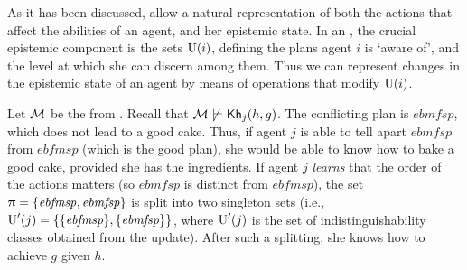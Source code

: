 As it has been discussed,  allow a natural representation of both the actions that affect the abilities of an agent, and her epistemic state. In an \ults, the crucial epistemic component is the sets $\operatorname{U}(i)$, defining the plans agent $i$ is `aware of', and the level at which she can discern among them. Thus we can represent changes in the epistemic state of
an agent by means of operations that modify $\operatorname{U}(i)$. 

\medskip

\begin{example}\label{ex:ref}
    Let $\mathcal{M}$ be the \ults from .
    Recall that $\mathcal{M}\not\models{\sf Kh}_j(h,g)$. The conflicting plan is $\mathit{ebmfsp}$, which does not lead to a good cake. Thus, if agent $j$ is able to tell apart $\mathit{ebmfsp}$ from $\mathit{ebfmsp}$ (which is the good plan), she would be able to know how to bake a good cake, provided she has the ingredients. If agent $j$ \emph{learns} that the
    order of the actions matters (so $\mathit{ebmfsp}$ is distinct from $\mathit{ebfmsp}$), the set $\uppi=\{ \mathit{ebfmsp}, \mathit{ebmfsp} \}$ is split into two singleton sets (i.e., $\operatorname{U}'(j)=\{ \{ \mathit{ebfmsp} \},\{ \mathit{ebmfsp} \} \}$, where $\operatorname{U}'(j)$ is the set of indistinguishability classes obtained from the update). After such a splitting, she knows how to achieve $g$ given $h$.
\end{example}

\medskip




